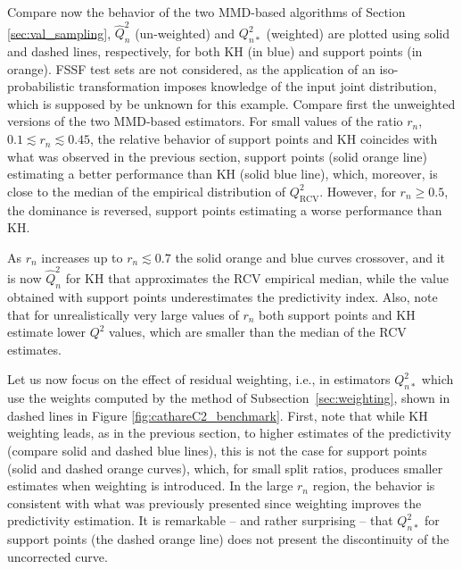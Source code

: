 Compare now the behavior of the two MMD-based algorithms of Section \ref{sec:val_sampling}, $\widehat Q^2_n$ (un-weighted) and $Q_{n*}^2$ (weighted) are plotted using solid and dashed lines, respectively, for both KH (in blue) and support points (in orange). 
FSSF test sets are not considered, as the application of an iso-probabilistic transformation imposes knowledge of the input joint distribution, which is supposed by be unknown for this example. 
Compare first the unweighted versions of the two MMD-based estimators. 
For small values of the ratio $r_n$, $0.1 \lesssim r_n \lesssim 0.45$, the relative behavior of support points and KH coincides with what was observed in the previous section, 
support points (solid orange line) estimating a better performance than KH (solid blue line), which, moreover, is close to the median of the empirical distribution of $Q^2_{\mathrm{RCV}}$. 
However, for $r_n \geq 0.5$, the dominance is reversed, support points estimating a worse performance than KH. 

As $r_n$ increases up to $r_n \lesssim 0.7$ the solid orange and blue curves crossover, and it is now $\widehat Q^2_n$ for KH that approximates the RCV empirical median, while the value obtained with support points underestimates the predictivity index. 
Also, note that for unrealistically very large values of $r_n$ both support points and KH estimate lower $Q^2$ values, which are smaller than the median of the RCV estimates.

Let us now focus on the effect of residual weighting, i.e., in estimators $Q_{n*}^2$ which use the weights computed by the method of Subsection~\ref{sec:weighting}, shown in dashed lines in Figure \ref{fig:cathareC2_benchmark}. 
First, note that while KH weighting leads, as in the previous section, to higher estimates of the predictivity (compare solid and dashed blue lines), this is not the case for support points (solid and dashed orange curves), which, for small split ratios, produces smaller estimates when weighting is introduced. 
In the large $r_n$ region, the behavior is consistent with what was previously presented since weighting improves the predictivity estimation. 
It is remarkable -- and rather surprising -- that $Q_{n*}^2$ for support points (the dashed orange line) does not present the discontinuity of the uncorrected curve. 


